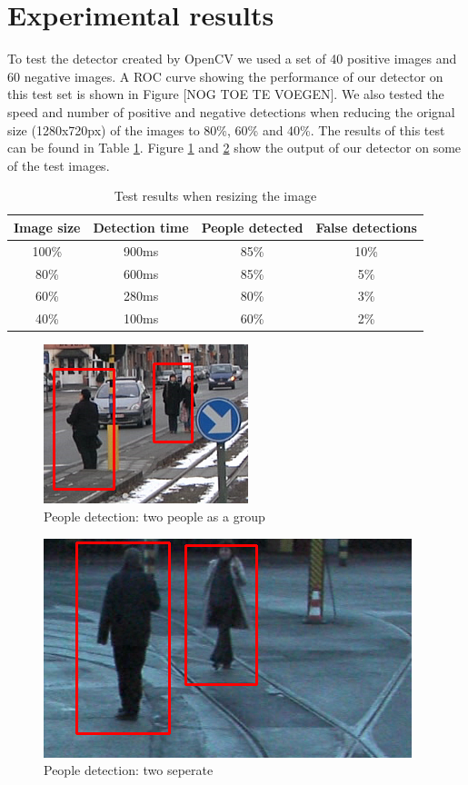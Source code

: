 \documentclass{article}
\begin{document}
\section{Experimental results}
To test the detector created by OpenCV we used a set of 40 positive images and 60 negative images. A ROC curve showing the performance of our detector on this test set is shown in Figure [NOG TOE TE VOEGEN]. We also tested the speed and number of positive and negative detections when reducing the orignal size (1280x720px) of the images to 80\%, 60\% and 40\%. The results of this test can be found in Table \ref{table:test}. Figure \ref{fig:pdetection1} and \ref{fig:pdetection2} show the output of our detector on some of the test images.
\begin{table}
    \begin{tabular}{ | c | c | c | c |}
    \hline
    Image size & Detection time & People detected & False detections \\ \hline
    100\%  & 900ms & 85\% & 10\% \\  \hline
    80\%   & 600ms & 85\% & 5\% \\  \hline
    60\%   & 280ms & 80\% & 3\% \\  \hline
    40\%   & 100ms & 60\% & 2\% \\ \hline
    \end{tabular}
    \caption{Test results when resizing the image}
    \label{table:test}
\end{table}
\begin{figure}[h!]
	\centering
	\includegraphics[scale=0.6]{peopledetection1.png}
	\caption{People detection: two people as a group}
	\label{fig:pdetection1}
\end{figure}
\begin{figure}[h!]
	\centering
	\includegraphics[scale=0.4]{peopledetection2.png}
	\caption{People detection: two seperate}
	\label{fig:pdetection2}
\end{figure}
\end{document}
